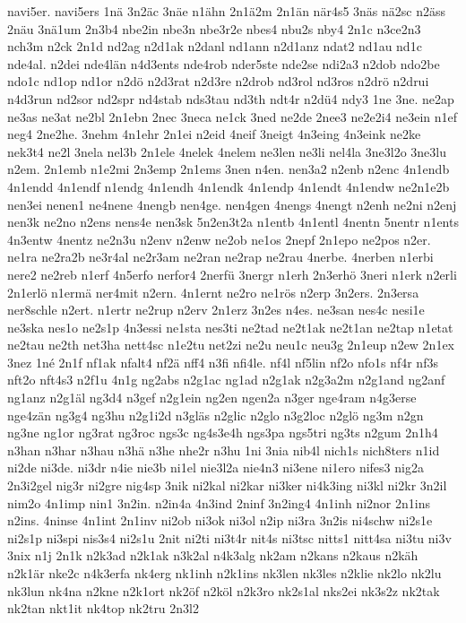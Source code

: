 {navi5er.
navi5ers
1nä
3n2äc
3näe
n1ähn
2n1ä2m
2n1än
när4s5
3näs
nä2sc
n2äss
2näu
3nä1um
2n3b4
nbe2in
nbe3n
nbe3r2e
nbes4
nbu2s
nby4
2n1c
n3ce2n3
nch3m
n2ck
2n1d
nd2ag
n2d1ak
n2danl
nd1ann
n2d1anz
ndat2
nd1au
nd1c
nde4al.
n2dei
nde4län
n4d3ents
nde4rob
nder5ste
nde2se
ndi2a3
n2dob
ndo2be
ndo1c
nd1op
nd1or
n2dö
n2d3rat
n2d3re
n2drob
nd3rol
nd3ros
n2drö
n2drui
n4d3run
nd2sor
nd2spr
nd4stab
nds3tau
nd3th
ndt4r
n2dü4
ndy3
1ne
3ne.
ne2ap
ne3as
ne3at
ne2bl
2n1ebn
2nec
3neca
ne1ck
3ned
ne2de
2nee3
ne2e2i4
ne3ein
n1ef
neg4
2ne2he.
3nehm
4n1ehr
2n1ei
n2eid
4neif
3neigt
4n3eing
4n3eink
ne2ke
nek3t4
ne2l
3nela
nel3b
2n1ele
4nelek
4nelem
ne3len
ne3li
nel4la
3ne3l2o
3ne3lu
n2em.
2n1emb
n1e2mi
2n3emp
2n1ems
3nen
n4en.
nen3a2
n2enb
n2enc
4n1endb
4n1endd
4n1endf
n1endg
4n1endh
4n1endk
4n1endp
4n1endt
4n1endw
ne2n1e2b
nen3ei
nenen1
ne4nene
4nengb
nen4ge.
nen4gen
4nengs
4nengt
n2enh
ne2ni
n2enj
nen3k
ne2no
n2ens
nens4e
nen3sk
5n2en3t2a
n1entb
4n1entl
4nentn
5nentr
n1ents
4n3entw
4nentz
ne2n3u
n2env
n2enw
ne2ob
ne1os
2nepf
2n1epo
ne2pos
n2er.
ne1ra
ne2ra2b
ne3r4al
ne2r3am
ne2ran
ne2rap
ne2rau
4nerbe.
4nerben
n1erbi
nere2
ne2reb
n1erf
4n5erfo
nerfor4
2nerfü
3nergr
n1erh
2n3erhö
3neri
n1erk
n2erli
2n1erlö
n1ermä
ner4mit
n2ern.
4n1ernt
ne2ro
ne1rös
n2erp
3n2ers.
2n3ersa
ner8schle
n2ert.
n1ertr
ne2rup
n2erv
2n1erz
3n2es
n4es.
ne3san
nes4c
nesi1e
ne3ska
nes1o
ne2s1p
4n3essi
ne1sta
nes3ti
ne2tad
ne2t1ak
ne2t1an
ne2tap
n1etat
ne2tau
ne2th
net3ha
nett4sc
n1e2tu
net2zi
ne2u
neu1c
neu3g
2n1eup
n2ew
2n1ex
3nez
1né
2n1f
nf1ak
nfalt4
nf2ä
nff4
n3fi
nfi4le.
nf4l
nf5lin
nf2o
nfo1s
nf4r
nf3s
nft2o
nft4s3
n2f1u
4n1g
ng2abs
n2g1ac
ng1ad
n2g1ak
n2g3a2m
n2g1and
ng2anf
ng1anz
n2g1äl
ng3d4
n3gef
n2g1ein
ng2en
ngen2a
n3ger
nge4ram
n4g3erse
nge4zän
ng3g4
ng3hu
n2g1i2d
n3gläs
n2glic
n2glo
n3g2loc
n2glö
ng3m
n2gn
ng3ne
ng1or
ng3rat
ng3roc
ngs3c
ng4s3e4h
ngs3pa
ngs5tri
ng3ts
n2gum
2n1h4
n3han
n3har
n3hau
n3hä
n3he
nhe2r
n3hu
1ni
3nia
nib4l
nich1s
nich8ters
n1id
ni2de
ni3de.
ni3dr
n4ie
nie3b
ni1el
nie3l2a
nie4n3
ni3ene
ni1ero
nifes3
nig2a
2n3i2gel
nig3r
ni2gre
nig4sp
3nik
ni2kal
ni2kar
ni3ker
ni4k3ing
ni3kl
ni2kr
3n2il
nim2o
4n1imp
nin1
3n2in.
n2in4a
4n3ind
2ninf
3n2ing4
4n1inh
ni2nor
2n1ins
n2ins.
4ninse
4n1int
2n1inv
ni2ob
ni3ok
ni3ol
n2ip
ni3ra
3n2is
ni4schw
ni2s1e
ni2s1p
ni3spi
nis3s4
ni2s1u
2nit
ni2ti
ni3t4r
nit4s
ni3tsc
nitts1
nitt4sa
ni3tu
ni3v
3nix
n1j
2n1k
n2k3ad
n2k1ak
n3k2al
n4k3alg
nk2am
n2kans
n2kaus
n2käh
n2k1är
nke2c
n4k3erfa
nk4erg
nk1inh
n2k1ins
nk3len
nk3les
n2klie
nk2lo
nk2lu
nk3lun
nk4na
n2kne
n2k1ort
nk2öf
n2köl
n2k3ro
nk2s1al
nks2ei
nk3s2z
nk2tak
nk2tan
nkt1it
nk4top
nk2tru
2n3l2
}

